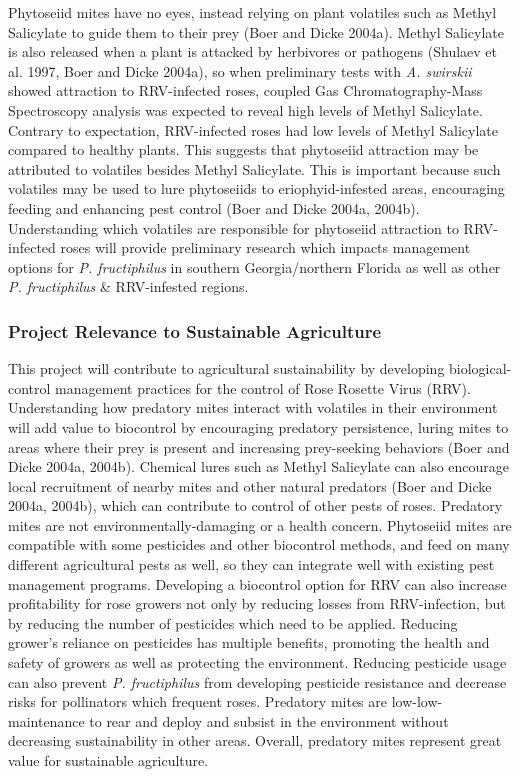 \documentclass[12pt,final,CPage]{ufthesis}
\begin{document}
{  Phytoseiid mites have no eyes, instead relying on plant volatiles such as Methyl Salicylate to guide them to their prey (Boer and Dicke 2004a). Methyl Salicylate is also released when a plant is attacked by herbivores or pathogens (Shulaev et al. 1997, Boer and Dicke 2004a), so when preliminary tests with \emph{A. swirskii} showed attraction to RRV-infected roses, coupled Gas Chromatography-Mass Spectroscopy analysis was expected to reveal high levels of Methyl Salicylate. Contrary to expectation, RRV-infected roses had low levels of Methyl Salicylate compared to healthy plants. This suggests that phytoseiid attraction may be attributed to volatiles besides Methyl Salicylate. This is important because such volatiles may be used to lure phytoseiids to eriophyid-infested areas, encouraging feeding and enhancing pest control (Boer and Dicke 2004a, 2004b). Understanding which volatiles are responsible for phytoseiid attraction to RRV-infected roses will provide preliminary research which impacts management options for \emph{P. fructiphilus} in southern Georgia/northern Florida as well as other \emph{P. fructiphilus} \& RRV-infested regions.

  \hypertarget{project-relevance-to-sustainable-agriculture}{%
  \subsubsection{Project Relevance to Sustainable Agriculture}\label{project-relevance-to-sustainable-agriculture}}

  This project will contribute to agricultural sustainability by developing biological-control management practices for the control of Rose Rosette Virus (RRV). Understanding how predatory mites interact with volatiles in their environment will add value to biocontrol by encouraging predatory persistence, luring mites to areas where their prey is present and increasing prey-seeking behaviors (Boer and Dicke 2004a, 2004b). Chemical lures such as Methyl Salicylate can also encourage local recruitment of nearby mites and other natural predators (Boer and Dicke 2004a, 2004b), which can contribute to control of other pests of roses. Predatory mites are not environmentally-damaging or a health concern. Phytoseiid mites are compatible with some pesticides and other biocontrol methods, and feed on many different agricultural pests as well, so they can integrate well with existing pest management programs. Developing a biocontrol option for RRV can also increase profitability for rose growers not only by reducing losses from RRV-infection, but by reducing the number of pesticides which need to be applied. Reducing grower's reliance on pesticides has multiple benefits, promoting the health and safety of growers as well as protecting the environment. Reducing pesticide usage can also prevent \emph{P. fructiphilus} from developing pesticide resistance and decrease risks for pollinators which frequent roses. Predatory mites are low-low-maintenance to rear and deploy and subsist in the environment without decreasing sustainability in other areas. Overall, predatory mites represent great value for sustainable agriculture.

}
\end{document}
